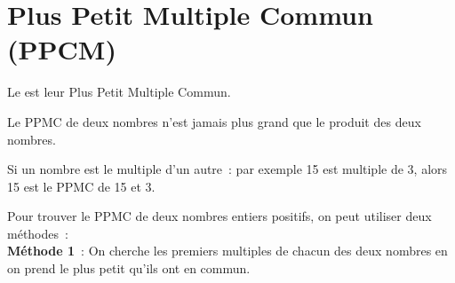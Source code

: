  
 \newpage
 
 \section{Plus Petit Multiple Commun (PPCM)}
 
\begin{definition}
Le  est leur Plus Petit Multiple Commun.
\end{definition}

 \begin{remarque}
Le PPMC de deux nombres n'est jamais plus grand que le produit des deux nombres.

Si un nombre est le multiple d'un autre : par exemple 15 est multiple de 3, alors 15 est le PPMC de 15 et 3.
 \end{remarque}
 

 
 Pour trouver le PPMC de deux nombres entiers positifs, on peut utiliser deux méthodes :  \\[1em]
\textcolor{H1}{\textbf{Méthode 1}} : On cherche les premiers multiples de chacun des deux nombres en on prend le plus petit qu'ils ont en commun.

 \vspace{2em}

